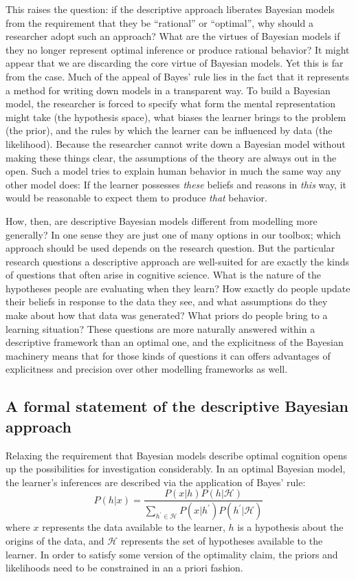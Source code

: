 \documentclass[doc,floatsintext]{apa6}
\newcommand{\be}{\begin{equation}}
\newcommand{\ee}{\end{equation}}
\begin{document}
This raises the question: if the descriptive approach liberates Bayesian models from the requirement that they be ``rational'' or ``optimal'', why should a researcher adopt such an approach? What are the virtues of Bayesian models if they no longer represent optimal inference or produce rational behavior? It might appear that we are discarding the core virtue of Bayesian models. Yet this is far from the case. Much of the appeal of Bayes' rule lies in the fact that it represents a method for writing down models in a transparent way. To build a Bayesian model, the researcher is forced to specify what form the mental representation might take (the hypothesis space), what biases the learner brings to the problem (the prior), and the rules by which the learner can be influenced by data (the likelihood). Because the researcher cannot write down a Bayesian model without making these things clear, the assumptions of the theory are always out in the open. Such a model tries to explain human behavior in much the same way any other model does: If the learner possesses {\it these} beliefs and reasons in {\it this} way, it would be reasonable to expect them to produce {\it that} behavior.

How, then, are descriptive Bayesian models different from modelling more generally? In one sense they are just one of many options in our toolbox; which approach should be used depends on the research question. But the particular research questions a descriptive approach are well-suited for are exactly the kinds of questions that often arise in cognitive science. What is the nature of the hypotheses people are evaluating when they learn? How exactly do people update their beliefs in response to the data they see, and what assumptions do they make about how that data was generated? What priors do people bring to a learning situation? These questions are more naturally answered within a descriptive framework than an optimal one, and the explicitness of the Bayesian machinery means that for those kinds of questions it can offers advantages of explicitness and precision over other modelling frameworks as well.



\subsection*{A formal statement of the descriptive Bayesian approach}

Relaxing the requirement that Bayesian models describe optimal cognition opens up the possibilities for investigation considerably. In an optimal Bayesian model, the learner's inferences are described via the application of Bayes' rule:
\be
P(h|x) = \frac{P(x|h)P(h|\mathcal{H})}{\sum_{h^\prime \in \mathcal{H}} P(x|h^\prime)P(h^\prime|\mathcal{H})}
\label{eq:obmc}
\ee
where $x$ represents the data available to the learner, $h$ is a hypothesis about the origins of the data, and $\mathcal{H}$ represents the set of hypotheses available to the learner. In order to satisfy some version of the optimality claim, the priors and likelihoods need to be constrained in an a priori fashion.
\end{document}
